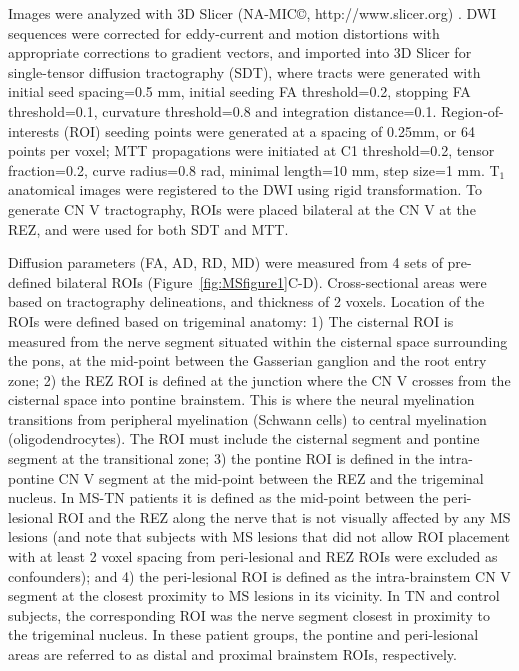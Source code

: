 Images were analyzed with 3D Slicer (NA-MIC©, http://www.slicer.org) \cite{Pieper2004}. DWI sequences were corrected for eddy-current and motion distortions with appropriate corrections to gradient vectors, and imported into 3D Slicer for single-tensor diffusion tractography (SDT), where tracts were generated with initial seed spacing=0.5 mm, initial seeding FA threshold=0.2, stopping FA threshold=0.1, curvature threshold=0.8 and integration distance=0.1. Region-of-interests (ROI) seeding points were generated at a spacing of 0.25mm, or 64 points per voxel; MTT propagations were initiated at C1 threshold=0.2, tensor fraction=0.2, curve radius=0.8 rad, minimal length=10 mm, step size=1 mm. T$_{1}$ anatomical images were registered to the DWI using rigid transformation. To generate CN V tractography, ROIs were placed bilateral at the CN V at the REZ, and were used for both SDT and MTT. 

Diffusion parameters (FA, AD, RD, MD) were measured from 4 sets of pre-defined bilateral ROIs (Figure~\ref{fig:MSfigure1}C-D). Cross-sectional areas were based on tractography delineations, and thickness of 2 voxels. Location of the ROIs were defined based on trigeminal anatomy: 1) The cisternal ROI is measured from the nerve segment situated within the cisternal space surrounding the pons, at the mid-point between the Gasserian ganglion and the root entry zone; 2) the REZ ROI is defined at the junction where the CN V crosses from the cisternal space into pontine brainstem. This is where the neural myelination transitions from peripheral myelination (Schwann cells) to central myelination (oligodendrocytes). The ROI must include the cisternal segment and pontine segment at the transitional zone; 3) the pontine ROI is defined in the intra-pontine CN V segment at the mid-point between the REZ and the trigeminal nucleus. In MS-TN patients it is defined as the mid-point between the peri-lesional ROI and the REZ along the nerve that is not visually affected by any MS lesions (and note that subjects with MS lesions that did not allow ROI placement with at least 2 voxel spacing from peri-lesional and REZ ROIs were excluded as confounders); and 4) the peri-lesional ROI is defined as the intra-brainstem CN V segment at the closest proximity to MS lesions in its vicinity. In TN and control subjects, the corresponding ROI was the nerve segment closest in proximity to the trigeminal nucleus. In these patient groups, the pontine and peri-lesional areas are referred to as distal and proximal brainstem ROIs, respectively. 

